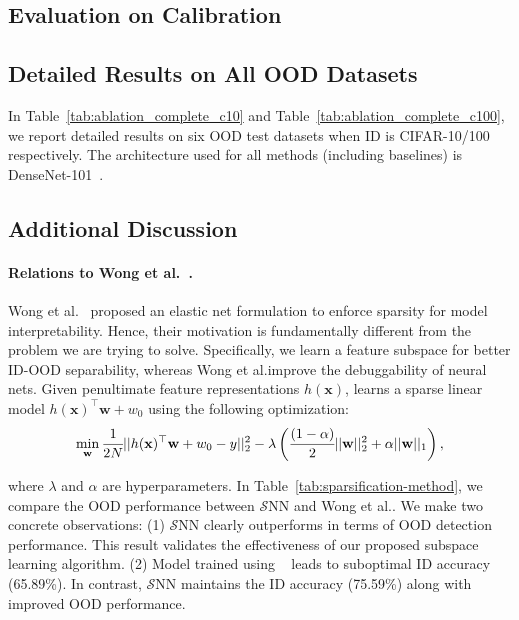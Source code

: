 \documentclass[letterpaper]{article} %
\def\etal{{et al.\xspace}}
\def\name{$\mathcal{S}$NN\xspace}
\def\*#1{\mathbf{#1}}
\theoremstyle{plain}
\theoremstyle{definition}
\theoremstyle{remark}
\begin{document}
\subsection{Evaluation on Calibration}
\label{app:calibration}


\subsection{Detailed Results on All OOD Datasets}
\label{app:results}

In Table~\ref{tab:ablation_complete_c10} and Table~\ref{tab:ablation_complete_c100}, we report detailed results on six OOD test datasets when ID is CIFAR-10/100 respectively. The architecture used for all methods (including baselines) is DenseNet-101~\cite{huang2018densely}. 





\subsection{Additional Discussion }
\label{app:add_discuss}
\paragraph{Relations to Wong \etal~\cite{wong2021leveraging}.} Wong \etal~\cite{wong2021leveraging} proposed an elastic net formulation to enforce sparsity for model interpretability. Hence, their motivation is fundamentally different from the problem we are trying to solve. Specifically, we learn a feature subspace for better ID-OOD separability, whereas Wong \etal improve the debuggability of neural nets. Given penultimate feature representations $h(\*x)$, \cite{wong2021leveraging} learns a sparse linear model $h(\*x)^{\top}\*w + w_0$ using the following optimization:
\begin{equation*}
\small  \min_{\*w}  \cfrac{1}{2N}||h(\*x)^{\top}\*w + w_0 -  y||^2_{2} - \lambda \left ( \cfrac{(1-\alpha)}{2}||\*w||_2^2 + \alpha||\*w||_1 \right),
\end{equation*}

where $\lambda$ and $\alpha$ are hyperparameters. In Table~\ref{tab:sparsification-method}, we compare the OOD performance between \name and Wong \etal. We make two concrete observations: (1) \name clearly outperforms \cite{wong2021leveraging} in terms of OOD detection performance. This result validates the effectiveness of our proposed subspace learning algorithm. (2) Model trained using ~\cite{wong2021leveraging} leads to suboptimal ID accuracy (65.89\%). In contrast, \name maintains the ID accuracy (75.59\%) along with improved OOD performance.






\end{document}
